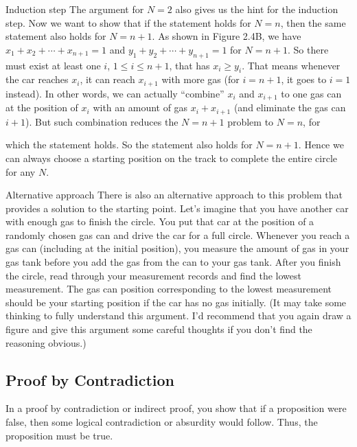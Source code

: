 \begin{solution}
\begin{concept}{Induction step}
The argument for $N=2$ also gives us the hint for the induction step. Now we want to show that if the statement holds for $N=n$, then the same statement also holds for $N=n+1$. As shown in Figure 2.4B, we have $x_1+x_2+\cdots+x_{n+1}=1$ and $y_1+y_2+\cdots+y_{n+1}=1$ for $N=n+1$. So there must exist at least one $i$, $1\leq i\leq n+1$, that has $x_i\geq y_i$. That means whenever the car reaches $x_i$, it can reach $x_{i+1}$ with more gas (for $i=n+1$, it goes to $i=1$ instead). In other words, we can actually ``combine'' $x_i$ and $x_{i+1}$ to one gas can at the position of $x_i$ with an amount of gas $x_i+x_{i+1}$ (and eliminate the gas can $i+1$). But such combination reduces the $N=n+1$ problem to $N=n$, for

which the statement holds. So the statement also holds for $N=n+1$. Hence we can always choose a starting position on the track to complete the entire circle for any $N$.

\end{concept}

\begin{concept}{Alternative approach}
There is also an alternative approach to this problem that provides a solution to the starting point. Let's imagine that you have another car with enough gas to finish the circle. You put that car at the position of a randomly chosen gas can and drive the car for a full circle. Whenever you reach a gas can (including at the initial position), you measure the amount of gas in your gas tank before you add the gas from the can to your gas tank. After you finish the circle, read through your measurement records and find the lowest measurement. The gas can position corresponding to the lowest measurement should be your starting position if the car has no gas initially. (It may take some thinking to fully understand this argument. I'd recommend that you again draw a figure and give this argument some careful thoughts if you don't find the reasoning obvious.)

\end{concept}

\end{solution}

\subsection{Proof by Contradiction}
In a proof by contradiction or indirect proof, you show that if a proposition were false, then some logical contradiction or absurdity would follow. Thus, the proposition must be true.

